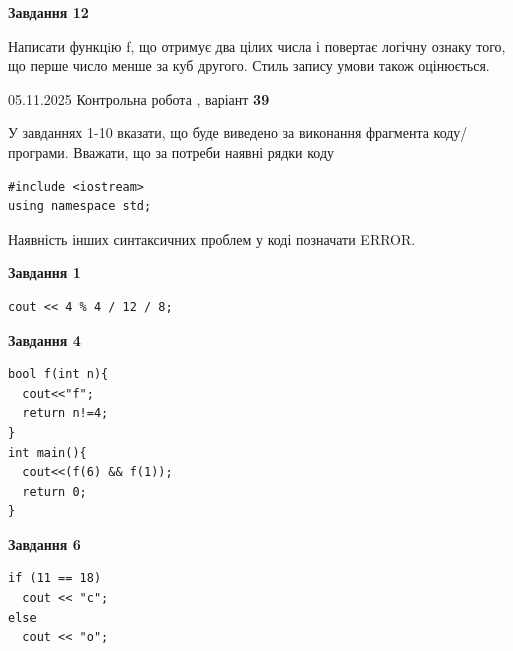 \documentclass[12pt, ukrainian]{article}
\begin{document}
{\begin {large}
\begin{minipage}[t]{11.0cm}
\begin{center}
\textbf{Завдання 12}
\end{center}

Написати функцiю f, що отримує два цілих числа і повертає логічну ознаку того, що перше число менше за куб другого. Стиль запису умови також оцінюється.\par

\end{minipage}

\end {large}}
\newpage

{\Large{05.11.2025 Контрольна робота , варіант  \No \textbf { 39 }\par}}
{
\begin {large}
У завданнях 1-10 вказати, що буде виведено за виконання фрагмента коду/про\-гра\-ми.
Вважати, що за потреби наявні рядки коду
\begin{verbatim}
#include <iostream>
using namespace std;
\end{verbatim}
Наявність інших синтаксичних проблем у коді позначати ERROR.

\begin{minipage}[t]{7.0cm}

\begin{center}
\textbf{Завдання 1}
\end{center}
\vspace{-8mm}

\begin{verbatim}
cout << 4 % 4 / 12 / 8;
\end{verbatim}



\begin{center}
\textbf{Завдання 4}
\end{center}
\vspace{-8mm}

\begin{verbatim}
bool f(int n){
  cout<<"f";
  return n!=4;
}
int main(){
  cout<<(f(6) && f(1));
  return 0;
}
\end{verbatim}



\begin{center}
\textbf{Завдання 6}
\end{center}
\vspace{-8mm}

\begin{verbatim}
if (11 == 18)
  cout << "c";
else
  cout << "o";
\end{verbatim}




\end{minipage}
\end{large}}
\end{document}
